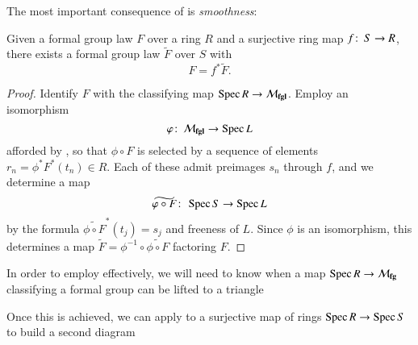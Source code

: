 The most important consequence of  is \emph{smoothness}:
\begin{corollary}\label{MfglIsSmooth}
Given a formal group law $F$ over a ring $R$ and a surjective ring map $f\colon\thinspace S \to R$, there exists a formal group law $\widetilde F$ over $S$ with \[F = f^* \widetilde F.\]
\end{corollary}
\begin{proof}
Identify $F$ with the classifying map $\operatorname{Spec} R \to \mathcal{M}_{\mathbf{fgl}}$.  Employ an isomorphism \[\varphi\colon\thinspace \mathcal{M}_{\mathbf{fgl}} \to \operatorname{Spec} L\] afforded by , so that $\phi \circ F$ is selected by a sequence of elements $r_n = \phi^* F^*(t_n) \in R$.  Each of these admit preimages $s_n$ through $f$, and we determine a map \[\widetilde{\varphi \circ F}\colon\thinspace \operatorname{Spec} S \to \operatorname{Spec} L\] by the formula $\widetilde{\phi \circ F}^* (t_j) = s_j$ and freeness of $L$.  Since $\phi$ is an isomorphism, this determines a map $\widetilde F = \phi^{-1} \circ \widetilde{\phi \circ F}$ factoring $F$.
\end{proof}

In order to employ  effectively, we will need to know when a map $\operatorname{Spec} R \to \mathcal{M}_{\mathbf{fg}}$ classifying a formal group can be lifted to a triangle
\begin{center}
\end{center}
Once this is achieved, we can apply  to a surjective map of rings $\operatorname{Spec} R \to \operatorname{Spec} S$ to build a second diagram
\begin{center}
\end{center}

